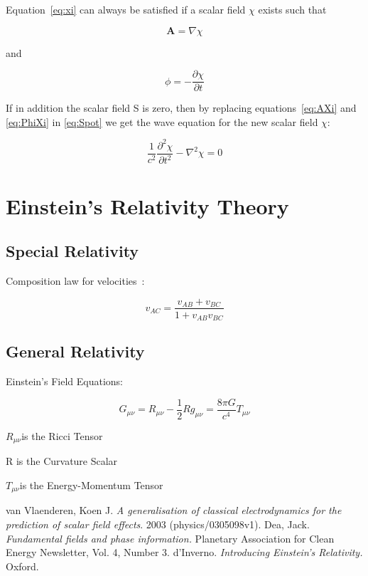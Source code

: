 \documentclass[english]{book}
\begin{document}
Equation~\ref{eq:xi} can always be satisfied if a scalar field $\chi$ exists such that

\begin{equation}
\mathbf{A} = \nabla \chi      \label{eq:AXi}
\end{equation}

and

\begin{equation}
\phi = - \frac{\partial \chi}{\partial t}        \label{eq:PhiXi}
\end{equation}

If in addition the scalar field S is zero, then by replacing equations~\ref{eq:AXi} and \ref{eq:PhiXi} in \ref{eq:Spot} we get the wave equation for the new scalar field $\chi$:

\begin{equation}
\frac{1}{c^{2}}\frac{\partial^{2}\chi}{\partial t^{2}} - \nabla^{2}\chi = 0
\end{equation}


\chapter{Einstein's Relativity Theory}

\section{Special Relativity}

Composition law for velocities~\cite{dinverno}:

\[
v_{AC} = \frac{v_{AB} + v_{BC}}{1+v_{AB}v_{BC}}
\]


\section{General Relativity}

Einstein's Field Equations:

\[
G_{\mu\nu}=R_{\mu\nu}-\frac{1}{2}Rg_{\mu\nu}=\frac{8\pi G}{c^{4}}T_{\mu\nu}
\]

$R_{\mu\nu}$is the Ricci Tensor

R is the Curvature Scalar

$T_{\mu\nu}$is the Energy-Momentum Tensor


\begin{thebibliography}{99}
	 van Vlaenderen, Koen J. \emph{A generalisation of classical electrodynamics for the prediction of scalar field effects}. 2003 (physics/0305098v1).
	 Dea, Jack. \emph{Fundamental fields and phase information.} Planetary Association for Clean Energy Newsletter, Vol. 4, Number 3.
	 d'Inverno. \emph{Introducing Einstein's Relativity.} Oxford.
\end{thebibliography}
\end{document}
